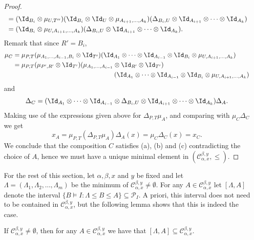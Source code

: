 \begin{proof}
$$\begin{aligned}
 &=(\Id_{B_i}\otimes \mu_{U,T''})(\Id_{B_i}\otimes \Id_U\otimes \mu_{A_{i+1},\ldots,A_k})(\Delta_{B_i,U}\otimes\Id_{A_{i+1}}
 \otimes\cdots\otimes \Id_{A_k})\\
 &=(\Id_{B_i}\otimes \mu_{U,A_{i+1},\ldots,A_k})(\Delta_{B_i,U}\otimes\Id_{A_{i+1}} \otimes\cdots\otimes \Id_{A_k}).\\
 \end{aligned}
 $$
Remark that since $R'=B_i$,
 $$
 \begin{aligned}
 \mu_C&=\mu_{P,T}(\mu_{A_1,\ldots,A_{i-1},B_i}\otimes \Id_{T'})(\Id_{A_{1}} \otimes\cdots\otimes \Id_{A_{i-1}}\otimes\Id_{B_i}\otimes \mu_{U,A_{i+1},\ldots,A_k})\\
 &=\mu_{P,T}(\mu_{P',R'}\otimes \Id_{T'})(\mu_{A_1,\ldots,A_{i-1}}\otimes\Id_{R'}\otimes\Id_{T'})
\\ 
&\hspace*{55mm} (\Id_{A_{1}} \otimes\cdots\otimes \Id_{A_{i-1}}\otimes\Id_{B_i}\otimes \mu_{U,A_{i+1},\ldots,A_k})\\
 \end{aligned}
 $$
 and 
 $$\Delta_C=(\Id_{A_{1}} \otimes\cdots\otimes \Id_{A_{i-1}}\otimes\Delta_{B_i,U}\otimes\Id_{A_{i+1}} \otimes\cdots\otimes \Id_{A_k})\Delta_A.$$
 Making use of the expressions given above for $\Delta_{P,T}\mu_A$, and comparing with $\mu_C\Delta_C$ we get
 $$x_A=\mu_{P,T}(\Delta_{P,T}\mu_A)\Delta_A(x)=\mu_C\Delta_C(x)=x_C.$$
We conclude that the composition $C$ satisfies (a), (b) and (c) contradicting the choice of $A$, hence we must have a unique minimal element in $(\mathcal{C}_{\alpha,x}^{\beta,y},\le)$.
\end{proof}

For the rest of this section, let $\alpha,\beta,x$ and $y$ be fixed and let $\Lambda=(\Lambda_1,\Lambda_2,\ldots,\Lambda_m)$ be the minimum of $\mathcal{C}_{\alpha,x}^{\beta,y}\ne \emptyset$.
For any $A\in\mathcal{C}_{\alpha,x}^{\beta,y}$ let $[\Lambda,A]$ denote the interval $\big\{ B\models I : \Lambda\le B\le A\big\}\subseteq \mathcal{P}_I$. A priori, this interval does not need to be contained in $\mathcal{C}_{\alpha,x}^{\beta,y}$, but the following lemma shows that this is indeed the case.

\begin{lemma}\label{le:lowerideal}
If $\mathcal{C}_{\alpha,x}^{\beta,y}\ne\emptyset$, then for any $A\in\mathcal{C}_{\alpha,x}^{\beta,y}$ we have that 
$[\Lambda,A]\subseteq \mathcal{C}_{\alpha,x}^{\beta,y}$.
\end{lemma}

